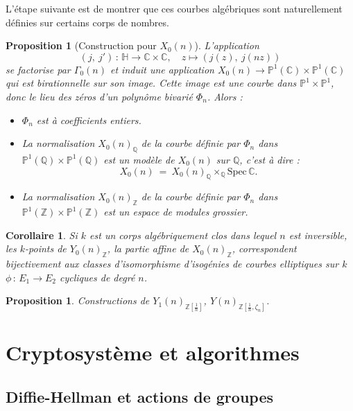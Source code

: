 \documentclass[11pt,a4paper]{article}
\newcommand{\Z}{\mathbb{Z}}
\newcommand{\C}{\mathbb{C}}
\newcommand{\Q}{\mathbb{Q}}
\renewcommand{\H}{\mathbb{H}}
\renewcommand{\P}{\mathbb{P}}
\newcommand{\vers}{\rightarrow}
\newcommand{\Spec}{\mathrm{Spec}\,}
\newcommand{\de}{\,:\,}
\newtheorem{prop}[thm]{Proposition}
\newtheorem{cor}[thm]{Corollaire}
\theoremstyle{definition}
\begin{document}
L'étape suivante est de montrer que ces courbes algébriques sont naturellement définies sur certains corps de nombres.

\begin{prop}[Construction pour $X_0(n)$]

L'application 
$$(j,\ j')\de \H\vers \C\times\C, \quad z\longmapsto (j(z),\ j(nz))$$ 
se factorise par $\Gamma_0(n)$ et induit une application $X_0(n)\vers \P^1(\C)\times \P^1(\C)$ qui est birationnelle sur son image. Cette image est une courbe dans $\P^1\times\P^1$, donc le lieu des zéros d'un polynôme bivarié $\Phi_n$. Alors :
\begin{itemize}
\item $\Phi_n$ est à coefficients entiers.
\item La normalisation $X_0(n)_\Q$ de la courbe définie par $\Phi_n$ dans $\P^1(\Q)\times \P^1(\Q)$ est un modèle de $X_0(n)$ sur $\Q$, c'est à dire :
$$X_0(n)\ =\ X_0(n)_\Q \times_{\Q} \Spec\C.$$
\item La normalisation $X_0(n)_\Z$ de la courbe définie par $\Phi_n$ dans $\P^1(\Z)\times \P^1(\Z)$ est un espace de modules grossier.
\end{itemize}

\end{prop}

\begin{cor}

Si $k$ est un corps algébriquement clos dans lequel $n$ est inversible, les $k$-points de $Y_0(n)_\Z$, la partie affine de $X_0(n)_\Z$, correspondent bijectivement
aux classes d'isomorphisme d'isogénies de courbes elliptiques sur $k$ $\phi\de E_1\vers E_2$ cycliques de degré $n$.

\end{cor}

\begin{prop}

Constructions de $Y_1(n)_{\Z\left[\frac{1}{n}\right]}$, $Y(n)_{\Z\left[\frac{1}{n},\zeta_n\right]}$.

\end{prop}

\section{Cryptosystème et algorithmes}



\subsection{Diffie-Hellman et actions de groupes}
\end{document}
